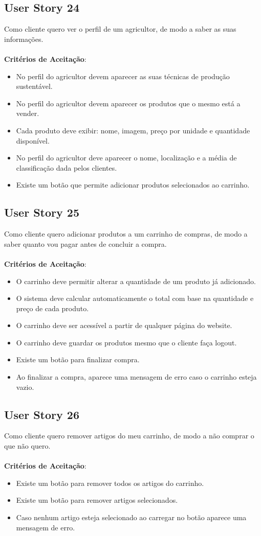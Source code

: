 \documentclass[a4paper,11pt]{article}
\begin{document}
\subsection{User Story 24}
Como cliente quero ver o perfil de um agricultor, de modo a saber as suas informações.\\\\
\textbf{Critérios de Aceitação}:
\begin{itemize}
  \item No perfil do agricultor devem aparecer as suas técnicas de produção sustentável.
  \item No perfil do agricultor devem aparecer os produtos que o mesmo está a vender.
  \item Cada produto deve exibir: nome, imagem, preço por unidade e quantidade disponível.
  \item No perfil do agricultor deve aparecer o nome, localização e a média de classificação dada pelos clientes.
  \item Existe um botão que permite adicionar produtos selecionados ao carrinho.
\end{itemize}
\subsection{User Story 25}
Como cliente quero adicionar produtos a um carrinho de compras, de modo a saber quanto vou pagar antes de concluir a compra.\\\\
\textbf{Critérios de Aceitação}:
\begin{itemize}
  \item O carrinho deve permitir alterar a quantidade de um produto já adicionado.
  \item O sistema deve calcular automaticamente o total com base na quantidade e preço de cada produto.
  \item O carrinho deve ser acessível a partir de qualquer página do website.
  \item O carrinho deve guardar os produtos mesmo que o cliente faça logout.
  \item Existe um botão para finalizar compra.
  \item Ao finalizar a compra, aparece uma mensagem de erro caso o carrinho esteja vazio.
\end{itemize}
\subsection{User Story 26}
Como cliente quero remover artigos do meu carrinho, de modo a não comprar o que não quero.\\\\
\textbf{Critérios de Aceitação}:
\begin{itemize}
  \item Existe um botão para remover todos os artigos do carrinho.
  \item Existe um botão para remover artigos selecionados.
  \item Caso nenhum artigo esteja selecionado ao carregar no botão aparece uma mensagem de erro.
\end{itemize}
\end{document}
